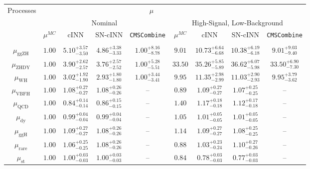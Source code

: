 \begin{table}[h!]
	\centering
	\begin{tabular}{ccccccccc}
		\multirow{3}{*}{Processes} & \multicolumn{7}{c}{$\mu$}\\
		&\multicolumn{4}{c}{Nominal}&\multicolumn{4}{c}{High-Signal, Low-Background} \\
		& $\mu^{MC}$ & cINN & SN-cINN & \texttt{CMSCombine} & $\mu^{MC}$ & cINN & SN-cINN & \texttt{CMSCombine} \\[0.1em]
		 \hline\\
		$\mu_\text{ggZH } $ & $1.00$ & $5.10^{+3.57}_{-3.50}$ & $4.86^{+3.38}_{-3.33}$ & $1.00^{+8.16}_{-8.78}$ & $9.01 $ & $10.73^{+6.64}_{-6.68}$ & $10.38^{+6.19}_{-6.18}$ & $9.01^{+9.03}_{-9.40}$\\[0.3em]
		$\mu_\text{ZHDY } $ & $1.00$ & $3.90^{+2.62}_{-2.57}$ & $3.76^{+2.57}_{-2.52}$ & $1.00^{+5.28}_{-5.51}$ & $33.50$ & $35.26^{+5.85}_{-5.89}$ & $36.62^{+6.07}_{-5.98}$ & $33.50^{+6.90}_{-7.30}$ \\[0.3em]
		$\mu_\text{WH   } $ & $1.00$ & $3.02^{+1.92}_{-1.90}$ & $2.93^{+1.80}_{-1.80}$ & $1.00^{+3.44}_{-3.41}$ & $9.95 $ & $11.35^{+2.98}_{-2.99}$ & $11.03^{+2.90}_{-2.93}$ & $9.95^{+3.79}_{-3.62}$ \\[0.3em]
		$\mu_\text{VBFH } $ & $1.00$ & $1.08^{+0.27}_{-0.27}$ & $1.08^{+0.26}_{-0.26}$ & --                        & $0.89 $ & $1.09^{+0.27}_{-0.27}$  & $1.07^{+0.25}_{-0.25}$  & -- \\[0.3em]
		$\mu_\text{QCD  } $ & $1.00$ & $0.84^{+0.14}_{-0.14}$ & $0.86^{+0.15}_{-0.15}$ & --                        & $1.40 $ & $1.17^{+0.18}_{-0.18}$  & $1.12^{+0.17}_{-0.18}$  & -- \\[0.3em]
		$\mu_\text{dy   } $ & $1.00$ & $0.99^{+0.04}_{-0.04}$ & $0.99^{+0.04}_{-0.04}$ & --                        & $1.05 $ & $1.01^{+0.05}_{-0.05}$  & $1.01^{+0.05}_{-0.05}$  & -- \\[0.3em]
		$\mu_\text{ggH  } $ & $1.00$ & $1.09^{+0.27}_{-0.27}$ & $1.08^{+0.26}_{-0.26}$ & --                        & $1.14 $ & $1.09^{+0.27}_{-0.27}$  & $1.08^{+0.25}_{-0.25}$  & -- \\[0.3em]
		$\mu_\text{rare } $ & $1.00$ & $1.06^{+0.25}_{-0.25}$ & $1.08^{+0.26}_{-0.26}$ & --                        & $0.88 $ & $1.03^{+0.23}_{-0.24}$  & $1.10^{+0.27}_{-0.26}$  & -- \\[0.3em]
		$\mu_\text{st   } $ & $1.00$ & $1.00^{+0.03}_{-0.03}$ & $1.00^{+0.03}_{-0.03}$ & --                        & $0.84 $ & $0.78^{+0.03}_{-0.03}$  & $0.77^{+0.03}_{-0.03}$  & -- \\[0.3em]

\end{tabular}
\end{table}
